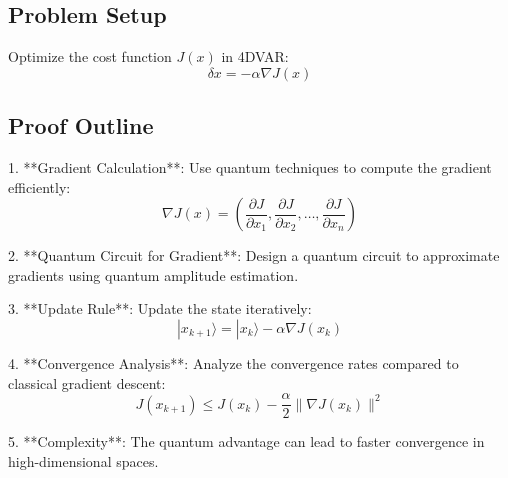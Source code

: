 \documentclass{article}
\begin{document}
\subsection{Problem Setup}

Optimize the cost function \( J(x) \) in 4DVAR:
\[
\delta x = -\alpha \nabla J(x)
\]

\subsection{Proof Outline}

1. **Gradient Calculation**: Use quantum techniques to compute the gradient efficiently:
   \[
   \nabla J(x) = \left( \frac{\partial J}{\partial x_1}, \frac{\partial J}{\partial x_2}, \ldots, \frac{\partial J}{\partial x_n} \right)
   \]

2. **Quantum Circuit for Gradient**: Design a quantum circuit to approximate gradients using quantum amplitude estimation.

3. **Update Rule**: Update the state iteratively:
   \[
   |x_{k+1}\rangle = |x_k\rangle - \alpha \nabla J(x_k)
   \]

4. **Convergence Analysis**: Analyze the convergence rates compared to classical gradient descent:
   \[
   J(x_{k+1}) \leq J(x_k) - \frac{\alpha}{2} \|\nabla J(x_k)\|^2
   \]

5. **Complexity**: The quantum advantage can lead to faster convergence in high-dimensional spaces.
\end{document}

